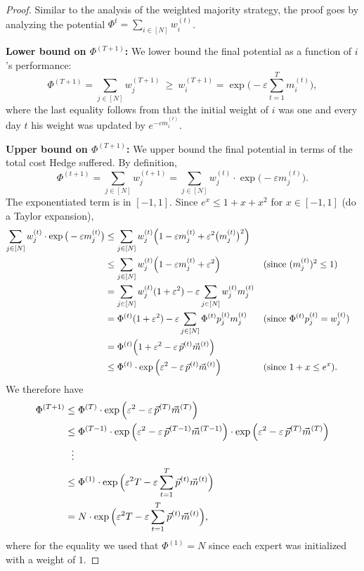 \begin{proof}
Similar to the analysis of the weighted majority strategy, the proof goes by analyzing the potential
$\Phi^{t}=\sum_{i\in[N]}w_i^{(t)}$.

\medskip
\noindent\textbf{Lower bound on $\Phi^{(T+1)}$:} We lower bound the final potential as a function of
$i$'s performance:
\[
  \Phi^{(T+1)}=\sum_{j\in[N]}w_j^{(T+1)}\ \ge\ w_i^{(T+1)}=\exp\Big(-\varepsilon\sum_{t=1}^T m_i^{(t)}\Big),
\]
where the last equality follows from that the initial weight of $i$ was one and every day $t$ his
weight was updated by $e^{-\varepsilon m_i^{(t)}}$.

\medskip
\noindent\textbf{Upper bound on $\Phi^{(T+1)}$:} We upper bound the final potential in terms of the
total cost Hedge suffered. By definition,
\[
  \Phi^{(t+1)}=\sum_{j\in[N]}w_j^{(t+1)}=\sum_{j\in[N]}w_j^{(t)}\cdot\exp\big(-\varepsilon m_j^{(t)}\big).
\]
The exponentiated term is in $[-1,1]$. Since $e^x\le 1+x+x^2$ for $x\in[-1,1]$ (do a Taylor
expansion),
\begin{align*}
  \sum_{j\in[N]}w_j^{(t)}\cdot\exp\big(-\varepsilon m_j^{(t)}\big)
  &\le\sum_{j\in[N]}w_j^{(t)}\Big(1-\varepsilon m_j^{(t)}+\varepsilon^2\big(m_j^{(t)}\big)^2\Big)\\
  &\le\sum_{j\in[N]}w_j^{(t)}\Big(1-\varepsilon m_j^{(t)}+\varepsilon^2\Big) &&\text{(since } (m_j^{(t)})^2\le 1)\\
  &=\sum_{j\in[N]}w_j^{(t)}(1+\varepsilon^2)-\varepsilon\sum_{j\in[N]}w_j^{(t)}m_j^{(t)}\\
  &=\Phi^{(t)}(1+\varepsilon^2)-\varepsilon\sum_{j\in[N]}\Phi^{(t)}p_j^{(t)}m_j^{(t)} &&\text{(since } \Phi^{(t)}p_j^{(t)}=w_j^{(t)})\\
  &=\Phi^{(t)}\Big(1+\varepsilon^2-\varepsilon\,\vec{p}^{(t)}\vec{m}^{(t)}\Big)\\
  &\le\Phi^{(t)}\cdot\exp\Big(\varepsilon^2-\varepsilon\,\vec{p}^{(t)}\vec{m}^{(t)}\Big) &&\text{(since } 1+x\le e^x).
\end{align*}
We therefore have
\begin{align*}
  \Phi^{(T+1)}&\le\Phi^{(T)}\cdot\exp\Big(\varepsilon^2-\varepsilon\,\vec{p}^{(T)}\vec{m}^{(T)}\Big)\\
  &\le\Phi^{(T-1)}\cdot\exp\Big(\varepsilon^2-\varepsilon\,\vec{p}^{(T-1)}\vec{m}^{(T-1)}\Big)\cdot\exp\Big(\varepsilon^2-\varepsilon\,\vec{p}^{(T)}\vec{m}^{(T)}\Big)\\
  &\ \ \vdots\\
  &\le\Phi^{(1)}\cdot\exp\Big(\varepsilon^2T-\varepsilon\sum_{t=1}^T\vec{p}^{(t)}\vec{m}^{(t)}\Big)\\
  &=N\cdot\exp\Big(\varepsilon^2T-\varepsilon\sum_{t=1}^T\vec{p}^{(t)}\vec{m}^{(t)}\Big),
\end{align*}
where for the equality we used that $\Phi^{(1)}=N$ since each expert was initialized with a weight of
$1$.


\end{proof}

